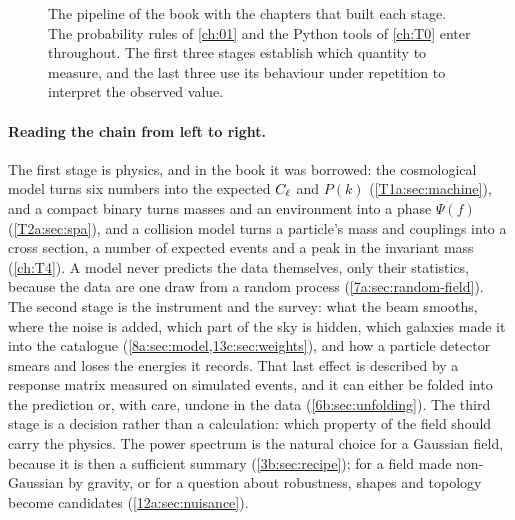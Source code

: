 \begin{figure}[htbp]
\caption{The pipeline of the book with the chapters that built each stage. The probability rules of \cref{ch:01} and the Python tools of \cref{ch:T0} enter throughout. The first three stages establish which quantity to measure, and the last three use its behaviour under repetition to interpret the observed value.}
\label{14a:fig:pipeline-chapters}
\end{figure}

\paragraph{Reading the chain from left to right.}
The first stage is physics, and in the book it was borrowed: the cosmological model
turns six numbers into the expected $C_\ell$ and $P(k)$ (\cref{T1a:sec:machine}), and a
compact binary turns masses and an environment into a phase $\Psi(f)$
(\cref{T2a:sec:spa}), and a collision model turns a particle's mass and couplings into
a cross section, a number of expected events and a peak in the invariant mass
(\cref{ch:T4}). A model never predicts the data themselves, only their
statistics, because the data are one draw from a random process
(\cref{7a:sec:random-field}). The second stage is the instrument and the survey: what
the beam smooths, where the noise is added, which part of the sky is hidden, which
galaxies made it into the catalogue (\cref{8a:sec:model,13c:sec:weights}), and how a
particle detector smears and loses the energies it records. That last effect is
described by a response matrix measured on simulated events, and it can either be
folded into the prediction or, with care, undone in the data
(\cref{6b:sec:unfolding}). The third
stage is a decision rather than a calculation: which property of the field should
carry the physics. The power spectrum is the natural choice for a Gaussian field,
because it is then a sufficient summary (\cref{3b:sec:recipe}); for a field made
non-Gaussian by gravity, or for a question about robustness, shapes and topology
become candidates (\cref{12a:sec:nuisance}).

